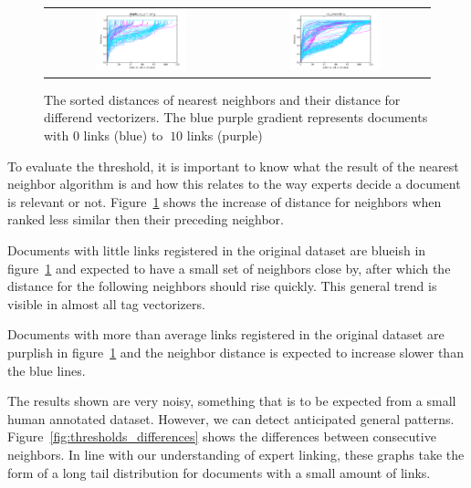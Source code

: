 \begin{figure}[h!]
\begin{tabular}{cc}
\includegraphics[width =0.5\textwidth]{images/thresh_cosine_simple_tag_similarity} 	& \includegraphics[width =0.5\textwidth]{images/thresh_cosine_tag_smoothing}
\end{tabular}
\caption{The sorted distances of nearest neighbors and their distance for differend vectorizers. The blue purple gradient represents documents with 0 links (blue) to $\>10$ links (purple)}
\label{fig:thresholds}
\end{figure}

To evaluate the threshold, it is important to know what the result of the nearest neighbor 
algorithm is and how this relates to the way experts decide a document is relevant or 
not. Figure~\ref{fig:thresholds} shows the increase of distance for neighbors when ranked
less similar then their preceding neighbor.

Documents with little links registered in the original dataset are blueish in 
figure~\ref{fig:thresholds} and expected to have a small set of neighbors close 
by, after which the distance for the following neighbors should rise quickly. This 
general trend is visible in almost all tag vectorizers. 

Documents with more than average links registered in the original dataset are 
purplish in figure~\ref{fig:thresholds} and the neighbor distance is expected to increase
slower than the blue lines.

The results shown are very noisy, something that is to be expected from a small
human annotated dataset. However, we can detect anticipated general patterns.
Figure~\ref{fig:thresholds_differences} shows the differences between consecutive 
neighbors. In line with our understanding of expert linking, these graphs take the 
form of a long tail distribution for documents with a small amount of links.

